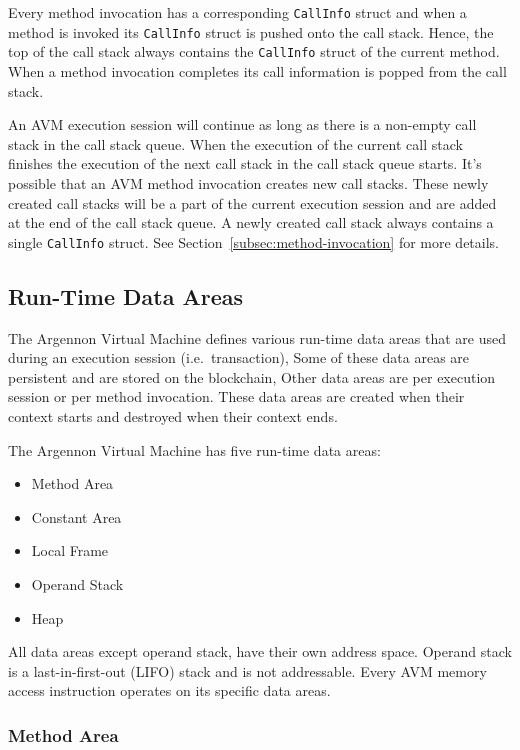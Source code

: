 \documentclass[11pt, a4paper]{report}
\begin{document}
    Every method invocation has a corresponding \texttt{CallInfo} struct and when a method is invoked its
    \texttt{CallInfo} struct is pushed onto the call stack. Hence, the top of the call stack always contains
    the \texttt{CallInfo} struct of the current method. When a method invocation completes its call
    information is popped from the call stack.

    An AVM execution session will continue as long as there is a non-empty call stack in the call stack queue. When the
    execution of the current call stack finishes the execution of the next call stack in the call stack queue starts.
    It's possible that an AVM method invocation creates new call stacks. These newly created call stacks will be a part
    of the current execution session and are added at the end of the call stack queue. A newly created call stack always
    contains a single \texttt{CallInfo} struct. See Section~\ref{subsec:method-invocation} for more details.

    \subsection{Run-Time Data Areas}\label{subsec:data-areas}

    The Argennon Virtual Machine defines various run-time data areas that are used during an execution session
    (i.e.\ transaction), Some of these data areas are persistent and are stored on the blockchain, Other data areas
    are per execution session or per method invocation. These data areas are created when their context starts and
    destroyed when their context ends.

    The Argennon Virtual Machine has five run-time data areas:
    \begin{itemize}
        \item Method Area
        \item Constant Area
        \item Local Frame
        \item Operand Stack
        \item Heap
    \end{itemize}
    All data areas except operand stack, have their own address space. Operand stack is a
    last-in-first-out (LIFO) stack and is not addressable. Every AVM memory access instruction operates on its specific
    data areas.

    \subsubsection{Method Area}
\end{document}
